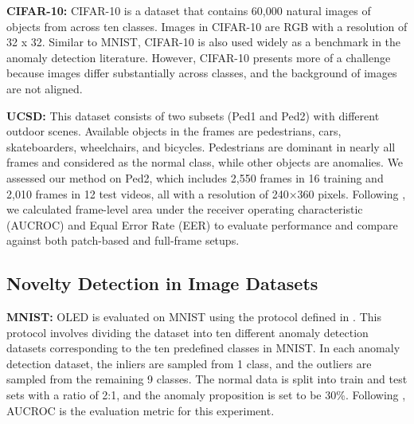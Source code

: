 \documentclass[10pt,twocolumn,letterpaper]{article}
\begin{document}
{\bf CIFAR-10:} CIFAR-10 is a dataset that contains 60,000 natural images of objects from across ten classes. Images in CIFAR-10 are RGB with a resolution of 32 x 32. Similar to MNIST, CIFAR-10 is also used widely as a benchmark in the anomaly detection literature. However, CIFAR-10 presents more of a challenge because images differ substantially across classes, and the background of images are not aligned.  

{\bf UCSD:} This dataset \cite{li2013anomaly} consists of two subsets (Ped1 and Ped2) with different outdoor scenes. Available objects in the frames are pedestrians, cars, skateboarders, wheelchairs, and bicycles. Pedestrians are dominant in nearly all frames and considered as the normal class, while other objects are anomalies. We assessed our method on Ped2, which includes 2,550 frames in 16 training and 2,010 frames in 12 test videos, all with a resolution of 240×360 pixels. Following \cite{zaheer2020old}, we calculated frame-level area under the receiver operating characteristic  (AUCROC) and Equal Error Rate (EER) to evaluate performance and compare against both patch-based and full-frame setups.

\subsection{Novelty Detection in Image Datasets}

{\bf MNIST:} OLED is evaluated on MNIST using the protocol defined in \cite{gong2019memorizing}. This protocol involves dividing the dataset into ten different anomaly detection datasets corresponding to the ten predefined classes in MNIST. In each anomaly detection dataset, the inliers are sampled from 1 class, and the outliers are sampled from the remaining 9 classes. The normal data is split into train and test sets with a ratio of 2:1, and the anomaly proposition is set to be 30\%. Following \cite{gong2019memorizing}, AUCROC is the evaluation metric for this experiment. 
\end{document}
